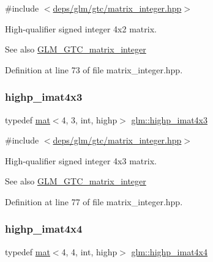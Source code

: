 {\ttfamily \#include $<$\hyperlink{matrix__integer_8hpp}{deps/glm/gtc/matrix\+\_\+integer.\+hpp}$>$}

High-\/qualifier signed integer 4x2 matrix. \begin{DoxySeeAlso}{See also}
\hyperlink{group__gtc__matrix__integer}{G\+L\+M\+\_\+\+G\+T\+C\+\_\+matrix\+\_\+integer} 
\end{DoxySeeAlso}


Definition at line 73 of file matrix\+\_\+integer.\+hpp.

\mbox{\label{group__gtc__matrix__integer_ga03ddba7301f182bf5cb1e66a6aa43bcb}} 
\subsubsection{\texorpdfstring{highp\+\_\+imat4x3}{highp\_imat4x3}}
{\footnotesize\ttfamily typedef \hyperlink{structglm_1_1mat}{mat}$<$4, 3, int, highp$>$ \hyperlink{group__gtc__matrix__integer_ga03ddba7301f182bf5cb1e66a6aa43bcb}{glm\+::highp\+\_\+imat4x3}}



{\ttfamily \#include $<$\hyperlink{matrix__integer_8hpp}{deps/glm/gtc/matrix\+\_\+integer.\+hpp}$>$}

High-\/qualifier signed integer 4x3 matrix. \begin{DoxySeeAlso}{See also}
\hyperlink{group__gtc__matrix__integer}{G\+L\+M\+\_\+\+G\+T\+C\+\_\+matrix\+\_\+integer} 
\end{DoxySeeAlso}


Definition at line 77 of file matrix\+\_\+integer.\+hpp.

\mbox{\label{group__gtc__matrix__integer_gaae7cdd2394ff80ecf1be6d78bfde629a}} 
\subsubsection{\texorpdfstring{highp\+\_\+imat4x4}{highp\_imat4x4}}
{\footnotesize\ttfamily typedef \hyperlink{structglm_1_1mat}{mat}$<$4, 4, int, highp$>$ \hyperlink{group__gtc__matrix__integer_gaae7cdd2394ff80ecf1be6d78bfde629a}{glm\+::highp\+\_\+imat4x4}}



